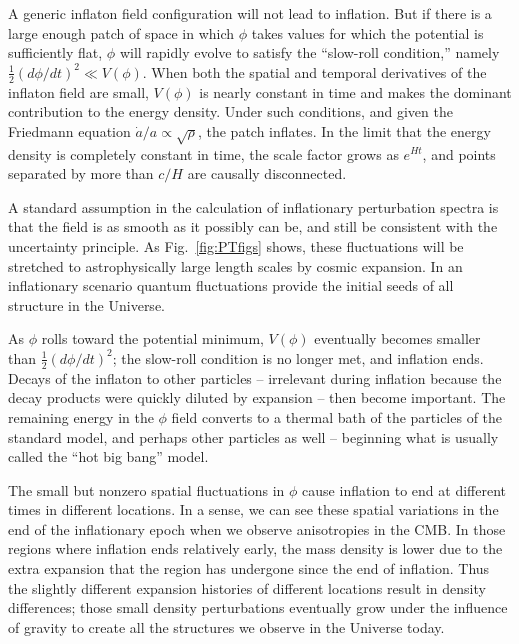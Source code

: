 A generic inflaton field configuration will not lead to inflation. But if there is a large enough patch of space in which $\phi$ takes values for which the potential is sufficiently flat, $\phi$ will rapidly evolve to satisfy the ``slow-roll condition,'' namely $\frac{1}{2} \left(d\phi/dt\right)^2 \ll V(\phi)$. When both the spatial and temporal derivatives of the inflaton field are small, $V(\phi)$ is nearly constant in time and makes the dominant contribution to the energy density. Under such conditions, and given the Friedmann equation $\dot a/a \propto \sqrt{\rho}$, the patch inflates. In the limit that the energy density is completely constant in time, the scale factor grows as $e^{H t}$, and points separated by more than $c/H$ are causally disconnected.

A standard assumption in the calculation of inflationary perturbation spectra is that the field is as smooth as it possibly can be, and still be consistent with the uncertainty principle. As Fig.~\ref{fig:PTfigs} shows, these fluctuations will be stretched to astrophysically large length scales by cosmic expansion. In an inflationary scenario quantum fluctuations provide the initial seeds of all structure in the Universe. 

As $\phi$ rolls toward the potential minimum, $V(\phi)$ eventually becomes smaller than $\frac{1}{2}(d\phi/dt)^2$; the slow-roll condition is no longer met, and inflation ends. Decays of the inflaton to other particles -- irrelevant during inflation because the decay products were quickly diluted by expansion -- then become important. The remaining energy in the $\phi$ field converts to a thermal bath of the particles of the standard model, and perhaps other particles as well -- beginning what is usually called the ``hot big bang'' model.

The small but nonzero spatial fluctuations in $\phi$ cause inflation to end at different times in different locations. In a sense, we can see these spatial variations in the end of the inflationary epoch when we observe anisotropies in the CMB.  In those regions where inflation ends relatively early, the mass density is lower due to the extra expansion that the region has undergone since the end of inflation. Thus the slightly different expansion histories of different locations result in density differences; those small density perturbations eventually grow under the influence of gravity to create all the structures we observe in the Universe today.

